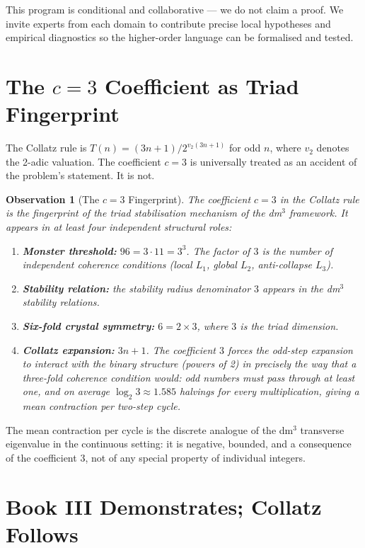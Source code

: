 \documentclass[11pt]{article}
\newtheorem{observation}{Observation}
\begin{document}
This program is conditional and collaborative --- we do not claim a proof. We invite experts from
each domain to contribute precise local hypotheses and empirical diagnostics so the higher-order
language can be formalised and tested.

\section{The $c = 3$ Coefficient as Triad Fingerprint}

The Collatz rule is $T(n) = (3n+1)/2^{v_2(3n+1)}$ for odd $n$, where $v_2$ denotes the 2-adic
valuation. The coefficient $c = 3$ is universally treated as an accident of the problem's
statement. It is not.

\begin{observation}[The $c = 3$ Fingerprint]
The coefficient $c = 3$ in the Collatz rule is the fingerprint of the triad stabilisation mechanism
of the dm$^3$ framework. It appears in at least four independent structural roles:
\begin{enumerate}
  \item \textbf{Monster threshold:} $96 = 3 \cdot 11 = 3^3$. The factor of $3$ is the number of
    independent coherence conditions (local $L_1$, global $L_2$, anti-collapse $L_3$).
  \item \textbf{Stability relation:} the stability radius denominator $3$ appears in the dm$^3$
    stability relations.
  \item \textbf{Six-fold crystal symmetry:} $6 = 2 \times 3$, where $3$ is the triad dimension.
  \item \textbf{Collatz expansion:} $3n + 1$. The coefficient $3$ forces the odd-step expansion to
    interact with the binary structure (powers of 2) in precisely the way that a three-fold
    coherence condition would: odd numbers must pass through at least one, and on average
    $\log_2 3 \approx 1.585$ halvings for every multiplication, giving a mean contraction per
    two-step cycle.
\end{enumerate}
\end{observation}

The mean contraction per cycle is the discrete analogue of the dm$^3$ transverse eigenvalue in the
continuous setting: it is negative, bounded, and a consequence of the coefficient $3$, not of any
special property of individual integers.

\section{Book III Demonstrates; Collatz Follows}
\end{document}
